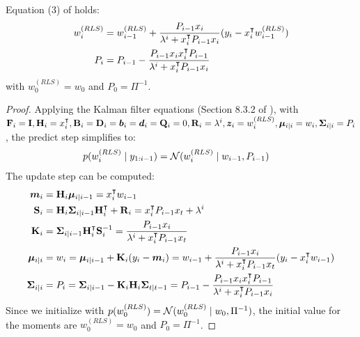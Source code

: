 \begin{corollary}
    Equation (3) of \cite{ORFit} holds:
    \begin{align}
        w_i^{(RLS)} &= w_{i-1}^{(RLS)} + \frac{P_{i-1}x_i}{\lambda^i + x_i^{\intercal}P_{i-1} x_i} (y_i - x_i^{\intercal} w_{i-1}^{(RLS)}) \\
        P_i &= P_{i-1} - \frac{P_{i-1} x_i x_i^{\intercal} P_{i-1} }{\lambda^{i} + x_i^{\intercal} P_{i-1} x_i}
    \end{align}
    with $w_0^{(RLS)} = w_0$ and $P_0 = \Pi^{-1}$.
    
\end{corollary}

\begin{proof}
    Applying the Kalman filter equations (Section 8.3.2 of \cite{pml2Book}), 
    with $\mathbf{F}_i = \mathbf{I}, \mathbf{H}_i = x_i^{\intercal}, \mathbf{B}_i = \mathbf{D}_i = {\bm{b}}_i = {\bm{d}}_i = \mathbf{Q}_i = 0, \mathbf{R}_i = \lambda^{i}, {\bm{z}}_i = w_i^{(RLS)}, \boldsymbol{\mu}_{i|i} = w_i, \boldsymbol{\Sigma}_{i|i} = P_{i}$, the predict step simplifies to:
    \begin{align}
        p(w_i^{(RLS)} \mid y_{1:i-1}) &= \mathcal{N}(w_i^{(RLS)} \mid w_{i-1}, P_{i-1} )
    \end{align}
    The update step can be computed:
    \begin{align}
        {\bm{m}}_i &= \mathbf{H}_i \boldsymbol{\mu}_{i|i-1} = x_i^{\intercal} w_{i-1} \\
        \mathbf{S}_i &= \mathbf{H}_i \boldsymbol{\Sigma}_{i|i-1} \mathbf{H}_i^{\intercal} + \mathbf{R}_i = x_i^{\intercal} P_{i-1} x_t + \lambda^{i} \\
        \mathbf{K}_i &= \boldsymbol{\Sigma}_{i|i-1} \mathbf{H}_i^{\intercal} \mathbf{S}_i^{-1} = \frac{P_{i-1} x_i}{\lambda^{i} + x_i^{\intercal} P_{i-1} x_t} \\
        \boldsymbol{\mu}_{i|i} &= w_i = \boldsymbol{\mu}_{i|i-1} + \mathbf{K}_i (y_i - {\bm{m}}_i) = w_{i-1} + 
        \frac{P_{i-1} x_i}{\lambda^{i} + x_i^{\intercal} P_{i-1} x_t} (y_i - x_i^{\intercal} w_{i-1}) \\
        \boldsymbol{\Sigma}_{i|i} &= P_i = \boldsymbol{\Sigma}_{i|i-1} - \mathbf{K}_{i} \mathbf{H}_i \boldsymbol{\Sigma}_{t|t-1} 
        = P_{i-1} - \frac{P_{i-1} x_i x_i^{\intercal} P_{i-1} }{\lambda^{i} + x_i^{\intercal} P_{i-1} x_i}
    \end{align}
    Since we initialize with $p(w_0^{(RLS)}) = \mathcal{N}(w_0^{(RLS)} \mid w_0, \Pi^{-1})$, the initial value for the moments are
    $w_0^{(RLS)} = w_0$ and $P_0 = \Pi^{-1}$.
\end{proof}

